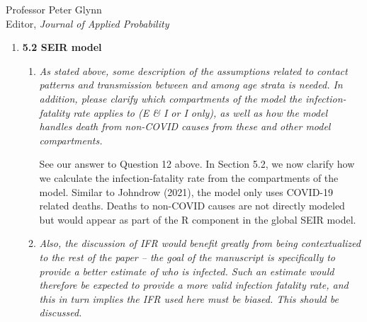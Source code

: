 \documentclass[11pt]{letter} %
\begin{document}
\begin{letter}{Professor
	Peter Glynn\\
	Editor, {\em Journal of Applied Probability}}
\begin{enumerate}
\begin{enumerate}
	We thank the reviewer for raising this issue.  We have added a remark in sction 5.1.2 that raises this as a limitation.  We restart here that the need for the approaches is due to the lack of availability of symptom status (which we know the state collects but has told us is unavailable due to data privacy / confidentiality issues).  Therefore, as a framework for health policy experts and government officials who have access to the complete government datasets (i.e., not just the public data), these steps will not be necessary.
	\vspace{5mm}
	\item {\it Also, focusing on the non-Hispanic, white male groups seems potentially to limit understanding of the scope of error. Although Indiana has a very high percent of white individuals, the individuals who present for testing (as well as those who test positive, are exposed in the workplace and home, and hospitalized or die) are disproportionately non-white. It is important to show the performance of the method in both white and non-white individuals because non-white individuals are the ones who are experiencing higher rates of illness and death and therefore will likely be more negatively impacted by biased estimates of disease prevalence.}
	\vspace{5mm}

	We acknowledge this shortcoming.  We now include versions of Figure 6 for non-white groups in Section XX of the supplementary materials.
	\textcolor{red}{NEED TO DO}
	\vspace{5mm}
\end{enumerate}
\item {\bf 5.2 SEIR model}
\begin{enumerate}
	\item {\it As stated above, some description of the assumptions related to contact patterns and transmission between and among age strata is needed. In addition, please clarify which compartments of the model the infection-fatality rate applies to (E \& I or I only), as well as how the model handles death from non-COVID causes from these and other model compartments.}
	\vspace{5mm}

	See our answer to Question 12 above.  In Section 5.2, we now clarify how we calculate the infection-fatality rate from the compartments of the model. Similar to Johndrow (2021), the model only uses COVID-19 related deaths.  Deaths to non-COVID causes are not directly modeled but would appear as part of the R component in the global SEIR model.
	\vspace{5mm}
	\item {\it Also, the discussion of IFR would benefit greatly from being contextualized to the rest of the paper – the goal of the manuscript is specifically to provide a better estimate of who is infected. Such an estimate would therefore be expected to provide a more valid infection fatality rate, and this in turn implies the IFR used here must be biased. This should be discussed.}
	\vspace{5mm}


\end{enumerate}
\end{enumerate}
\end{letter}
\end{document}
